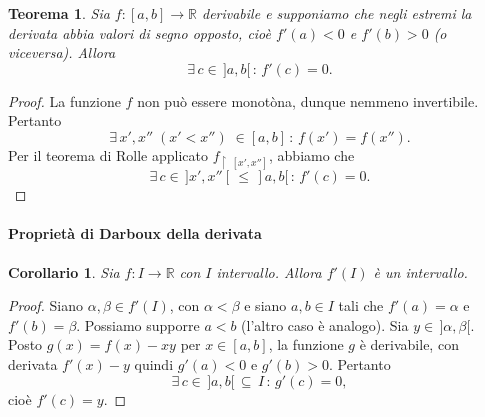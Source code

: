 \documentclass{article}
\theoremstyle{plain}
\newtheorem{thm}{Teorema}[section]
\newtheorem{cor}{Corollario}
\theoremstyle{definition}
\theoremstyle{remark}
\begin{document}
\vspace{10pt}

\begin{bxthm}
\begin{thm}
    Sia $f:[a,b]\to\mathbb{R}$ derivabile e supponiamo che negli estremi la derivata abbia valori di segno opposto, cioè $f'(a)<0$ e $f'(b)>0$ (o viceversa). 
    Allora \[\exists\,c\in\,]a,b[\,:\,f'(c)=0.\]
\end{thm}
\end{bxthm}
\begin{proof}
    La funzione $f$ non può essere monotòna, dunque nemmeno invertibile.
    Pertanto 
    \[\exists\, x',x''\;(x'<x'')\;\in[a,b]\,:\,f(x')=f(x''). \]
    Per il teorema di Rolle applicato $f_{\upharpoonright \  [x',x'']}$, abbiamo che 
    \[\exists\,c\in\,]x',x''[\,\leq\,]a,b[\,:\,f'(c)=0.\]
\end{proof}

\vspace{10pt}

\paragraph{Proprietà di Darboux della derivata}
\begin{bxthm}
\begin{cor}
    Sia $f:I\to\mathbb{R}$ con $I$ intervallo. Allora $f'(I)$ è un intervallo.
\end{cor}
\end{bxthm}
\begin{proof}
    Siano $\alpha,\beta\in f'(I)$, con $\alpha<\beta$ e siano $a,b\in I$ tali che $f'(a)=\alpha$ e $f'(b)=\beta$.
    Possiamo supporre $a<b$ (l'altro caso è analogo).
    Sia $y\in\,]\alpha,\beta[$. 
    Posto $g(x)=f(x)-xy$ per $x\in[a,b]$, la funzione $g$ è derivabile, con derivata $f'(x)-y$ quindi $g'(a)<0$ e $g'(b)>0$. 
    Pertanto 
    \[\exists\,c\in\,]a,b[\,\subseteq\, I\,:\,g'(c)=0,\] 
    cioè $f'(c)=y$.
\end{proof}

\vspace{10pt}
\end{document}
